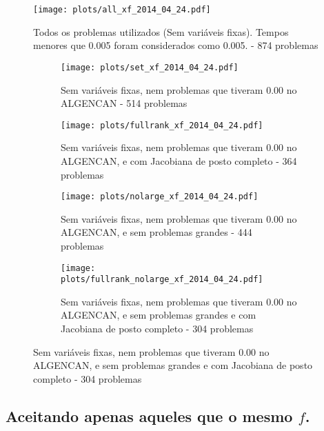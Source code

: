 \documentclass{article}
\begin{document}
\begin{figure}[H]
  \centering
  \texttt{[image: plots/all\_xf\_2014\_04\_24.pdf]}
  \caption{Todos os problemas utilizados (Sem variáveis fixas). Tempos menores
    que 0.005 foram considerados como 0.005. - 874 problemas}
\end{figure}
\begin{figure}[H]
  \centering
  \begin{subfigure}{0.48\textwidth}
    \texttt{[image: plots/set\_xf\_2014\_04\_24.pdf]}
    \caption{Sem variáveis fixas, nem problemas
      que tiveram 0.00 no ALGENCAN - 514 problemas}
  \end{subfigure}
  \begin{subfigure}{0.48\textwidth}
    \texttt{[image: plots/fullrank\_xf\_2014\_04\_24.pdf]}
    \caption{Sem variáveis fixas, nem problemas
      que tiveram 0.00 no ALGENCAN, e com Jacobiana de posto completo - 364
      problemas}
  \end{subfigure}
  \begin{subfigure}{0.48\textwidth}
    \texttt{[image: plots/nolarge\_xf\_2014\_04\_24.pdf]}
    \caption{Sem variáveis fixas, nem problemas
      que tiveram 0.00 no ALGENCAN, e sem problemas grandes - 444 problemas}
  \end{subfigure}
  \begin{subfigure}{0.48\textwidth}
    \texttt{[image: plots/fullrank\_nolarge\_xf\_2014\_04\_24.pdf]}
    \caption{Sem variáveis fixas, nem problemas
      que tiveram 0.00 no ALGENCAN, e sem problemas grandes e com Jacobiana de
      posto completo - 304 problemas}
  \end{subfigure}
\end{figure}

\subsection{Aceitando apenas aqueles que o mesmo $f$. }
\end{document}
